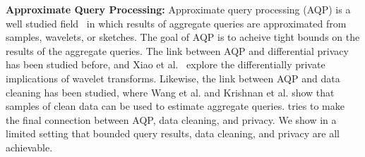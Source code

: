 \vspace{0.5em}

\noindent\textbf{Approximate Query Processing: } Approximate query processing (AQP) is a well studied field~\cite{AgarwalMPMMS13, olken1993random, garofalakis2001approximate} in which results of aggregate queries are approximated from samples, wavelets, or sketches. The goal of AQP is to acheive tight bounds on the results of the aggregate queries. The link between AQP and differential privacy has been studied before, and Xiao et al.~\cite{DBLP:journals/tkde/XiaoWG11} explore the differentially private implications of wavelet transforms. Likewise, the link between AQP and data cleaning has been studied, where Wang et al. and Krishnan et al. \cite{wang1999sample,krishnan2015svc} show that samples of clean data can be used to estimate aggregate queries.
\sys tries to make the final connection between AQP, data cleaning, and privacy.
We show in a limited setting that bounded query results, data cleaning, and privacy are all achievable.
 



